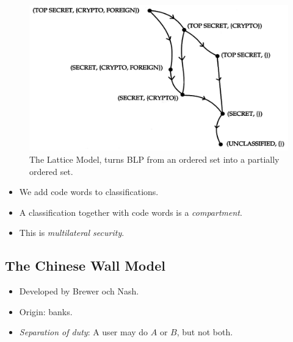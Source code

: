 \begin{frame}{\insertsubsectionhead}
  \begin{figure}
    \includegraphics[height=0.6\textheight]{lattice.png}
    \caption{The Lattice Model, turns BLP from an ordered set into a partially 
      ordered set.}
  \end{figure}
\end{frame}

\begin{frame}
  \begin{definition}
    \begin{itemize}
      \item We add code words to classifications.
      \item A classification together with code words is a \emph{compartment}.
      \item This is \emph{multilateral security}.
    \end{itemize}
  \end{definition}
\end{frame}

\subsection{The Chinese Wall Model}
\begin{frame}
  \begin{idea}
    \begin{itemize}
      \item Developed by Brewer och Nash.
      \item Origin: banks.
      \item \emph{Separation of duty}:
        A user may do \(A\) or \(B\), but not both.
    \end{itemize}
  \end{idea}
\end{frame}

